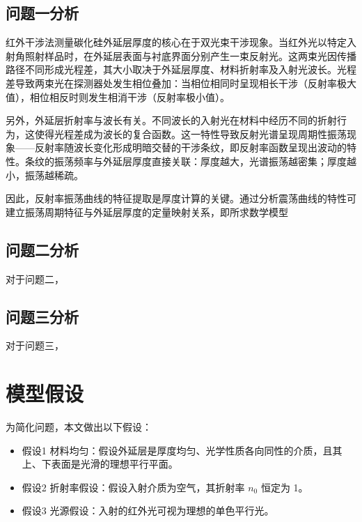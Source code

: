 \documentclass{cumcmthesis}
\begin{document}
\subsection{问题一分析}
红外干涉法测量碳化硅外延层厚度的核心在于双光束干涉现象。当红外光以特定入射角照射样品时，在外延层表面与衬底界面分别产生一束反射光。这两束光因传播路径不同形成光程差，其大小取决于外延层厚度、材料折射率及入射光波长。光程差导致两束光在探测器处发生相位叠加：当相位相同时呈现相长干涉（反射率极大值），相位相反时则发生相消干涉（反射率极小值）。

另外，外延层折射率与波长有关。不同波长的入射光在材料中经历不同的折射行为，这使得光程差成为波长的复合函数。这一特性导致反射光谱呈现周期性振荡现象——反射率随波长变化形成明暗交替的干涉条纹，即反射率函数呈现出波动的特性。条纹的振荡频率与外延层厚度直接关联：厚度越大，光谱振荡越密集；厚度越小，振荡越稀疏。

因此，反射率振荡曲线的特征提取是厚度计算的关键。通过分析震荡曲线的特性可建立振荡周期特征与外延层厚度的定量映射关系，即所求数学模型

\subsection{问题二分析}	
对于问题二，

\subsection{问题三分析}
对于问题三，



\section{模型假设}

为简化问题，本文做出以下假设：

\begin{itemize}[itemindent=2em]
\item 假设1 材料均匀：假设外延层是厚度均匀、光学性质各向同性的介质，且其上、下表面是光滑的理想平行平面。
\item 假设2 折射率假设：假设入射介质为空气，其折射率 $n_0$ 恒定为 1。

\item 假设3 光源假设：入射的红外光可视为理想的单色平行光。
\end{itemize}

\end{document}
